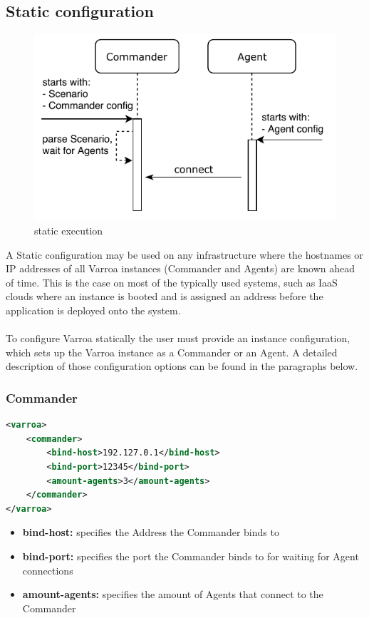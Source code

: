 \subsection{Static configuration}
\begin{figure}[h]
\begin{center}
\includegraphics[scale=1]{Resources/PDF/ExecutionStaticInit}
\caption{static execution}
\label{pic:staticExecution}
\end{center}
\end{figure}

A Static configuration may be used on any infrastructure where the hostnames or IP addresses of all Varroa instances (Commander and Agents) are known ahead of time. This is the case on most of the typically used systems, such as IaaS clouds where an instance is booted and is assigned an address before the application is deployed onto the system.\\
\\
To configure Varroa statically the user must provide an instance configuration, which sets up the Varroa instance as a Commander or an Agent.
A detailed description of those configuration options can be found in the paragraphs below.

\subsubsection{Commander}\label{sec:commanderConfig}
\begin{lstlisting}[caption={Commander XML configuration example}, captionpos=b, label={lst:commanderConfig}, language=XML]
<varroa>
    <commander>
		<bind-host>192.127.0.1</bind-host>
        <bind-port>12345</bind-port>
        <amount-agents>3</amount-agents>
    </commander>
</varroa>
\end{lstlisting}
\begin{itemize}
	\item \textbf{bind-host:} specifies the Address the Commander binds to
	\item \textbf{bind-port:} specifies the port the Commander binds to for waiting for Agent connections
	\item \textbf{amount-agents:} specifies the amount of Agents that connect to the Commander
\end{itemize}

